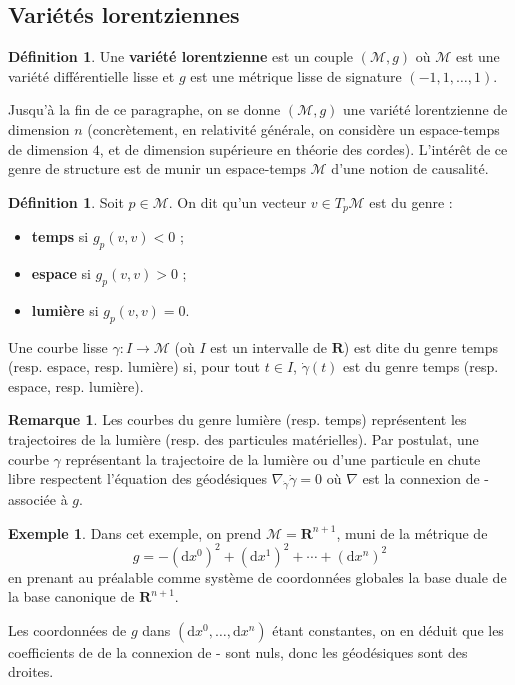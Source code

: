 \documentclass[12pt,a4paper]{article}
\theoremstyle{definition}
\newtheorem{defn}[thm]{Définition}
\newtheorem{ex}[thm]{Exemple}
\newtheorem{rqe}[thm]{Remarque}
\begin{document}
\subsection{Variétés lorentziennes}
\begin{defn}
Une \textbf{variété lorentzienne} est un couple $(\mathcal{M},g)$ où $\mathcal{M}$ est une variété différentielle lisse et $g$ est une métrique lisse de signature $(-1,1,\ldots,1)$.
\end{defn}
Jusqu'à la fin de ce paragraphe, on se donne $(\mathcal{M},g)$ une variété lorentzienne de dimension $n$ (concrètement, en relativité générale, on considère un espace-temps de dimension $4$, et de dimension supérieure en théorie des cordes).
L'intérêt de ce genre de structure est de munir un espace-temps $\mathcal{M}$ d'une notion de causalité.
\begin{defn}
Soit $p\in\mathcal{M}$. On dit qu'un vecteur $v\in T_p\mathcal{M}$ est du genre :
\begin{itemize}
\item \textbf{temps} si $g_p(v,v)<0$ ;
\item \textbf{espace} si $g_p(v,v)>0$ ;
\item \textbf{lumière} si $g_p(v,v)=0$.
\end{itemize}
Une courbe lisse $\gamma:I\to\mathcal{M}$ (où $I$ est un intervalle de $\mathbf{R}$) est dite du genre temps (resp. espace, resp. lumière) si, pour tout $t\in I$, $\dot{\gamma}(t)$ est du genre temps (resp. espace, resp. lumière).
\end{defn}
\begin{rqe}
Les courbes du genre lumière (resp. temps) représentent les trajectoires de la lumière (resp. des particules matérielles). Par postulat, une courbe $\gamma$ représentant la trajectoire de la lumière ou d'une particule en chute libre respectent l'équation des géodésiques $\nabla_{\dot{\gamma}}\dot{\gamma}=0$ où $\nabla$ est la connexion de - associée à $g$.
\end{rqe}
\begin{ex}
Dans cet exemple, on prend $\mathcal{M}=\mathbf{R}^{n+1}$, muni de la métrique de $$g=-\left(\mathrm{d}x^0\right)^2+\left(\mathrm{d}x^1\right)^2+\cdots+\left(\mathrm{d}x^n\right)^2$$en prenant au préalable comme système de coordonnées globales la base duale de la base canonique de $\mathbf{R}^{n+1}$.

\medskip

Les coordonnées de $g$ dans $(\mathrm{d}x^0,\ldots,\mathrm{d}x^n)$ étant constantes, on en déduit que les coefficients de  de la connexion de - sont nuls, donc les géodésiques sont des droites.
\end{ex}
\newpage
\end{document}
